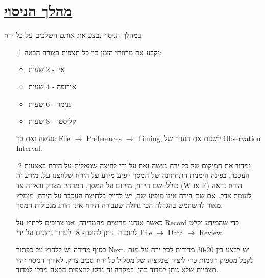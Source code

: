 \documentclass[a4paper, 12pt]{article}
\begin{document}
    \section{\underline{מהלך הניסוי}}
    \begin{flushright}
        במהלך הניסוי נבצע את אותם השלבים על כל ירח:

        \begin{enumerate}
            \item[.1] נקבע את מרווחי הזמן בין כל תצפית בצורה הבאה:
            \begin{itemize}
                \item איו - 2 שעות
                \item אירופה - 4 שעות
                \item גנימד - 6 שעות
                \item קליסטו - 8 שעות
            \end{itemize}
            נעשה זאת כך: \textenglish{File $\rightarrow$ Preferences $\rightarrow$ Timing}, לשנות את הערך של 
            \textenglish{Observation Interval}.
            
            \item[.2] נמדוד את המיקום של כל ירח
            נעשה זאת על ידי לחיצה שמאלית על הירח באצעות העכבר, בפינה הימנית התחתונה של המסך
            יופיע מידע על הירח שלחצנו על, מידע זה כולל: שם הירח, מיקום על המסך, המרחק מצדק
            ובאיזה צד \textenglish{(W או E)} הירח נראה לעומת צדק.
            אם שם הירח אינו מופיע שם, יש לדייק בלחיצת העכבר על הירח, מומלץ מאוד להשתמש
            בהגדלה הכי גדולה שעבורה הירח אינו חורג מגבולות המסך.
            
            כאשר אנחנו מרוצים מהמדידה, אנו צריכים ללחוץ על
            Record כדי שהמידע יקלט לתוכנה.
            ניתן להוסיף או לערוך נתונים על ידי \textenglish{File $\rightarrow$ Data $\rightarrow$ Review}.
            
            בסוף מדידה יש ללחוץ על כפתור \textenglish{Next}. 
            יש לבצע בין 30-20 מדידות לכל ירח על מנת לקבל מספיק דגימות
            כדי ליצור פונקציה של מסלול כל ירח סביב צדק. לאורך הניסוי יהיו תצפיות שלא ניתן למדוד בהן, במקרה זה
            נדלג לתצפית הבאה מבלי למדוד.
        \end{enumerate}
    \end{flushright}
\end{document}
